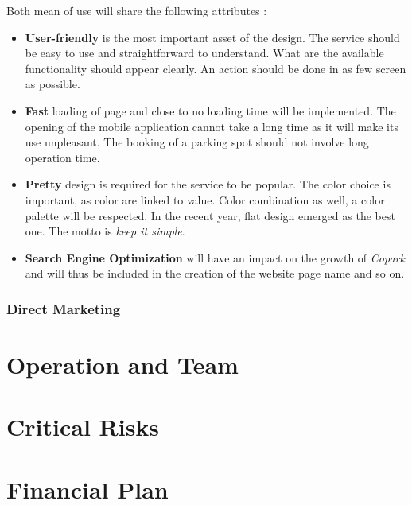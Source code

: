 \documentclass[12pt,a4paper,oneside]{book}
\newcommand{\bp}{\textit{Copark }}
\begin{document}
Both mean of use will share the following attributes :
\begin{itemize}
\item \textbf{User-friendly} is the most important asset of the design. The service should be easy to use and straightforward to understand. What are the available functionality should appear clearly. An action should be done in as few screen as possible.
\item \textbf{Fast} loading of page and close to no loading time will be implemented. The opening of the mobile application cannot take a long time as it will make its use unpleasant. The booking of a parking spot should not involve long operation time.
\item \textbf{Pretty} design is required for the service to be popular. The color choice is important, as color are linked to value. Color combination as well, a color palette will be respected. In the recent year, flat design emerged as the best one. The motto is \textit{keep it simple}.
\item \textbf{Search Engine Optimization} will have an impact on the growth of \bp and will thus be included in the creation of the website page name and so on.
\end{itemize}

\subsection{Direct Marketing}

\chapter{Operation and Team}

\chapter{Critical Risks}

\chapter{Financial Plan}



%

\end{document}
